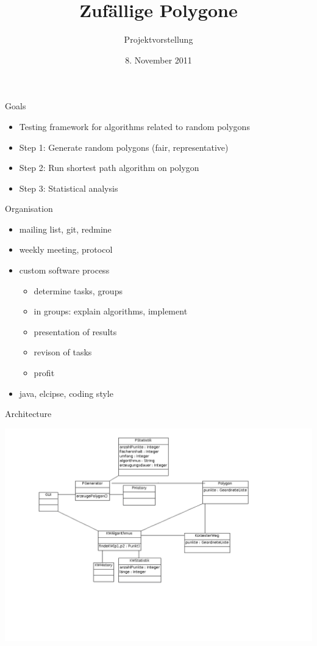 \documentclass[ucs,11pt]{beamer}
\title[Zufällige Polygone]{Zufällige Polygone}
\subtitle{Projektvorstellung}
\institute[FU Berlin]{Freie Universität Berlin}
\date[08.11.2011]{8. November 2011}
\begin{document}
\begin{frame}[plain]
	\titlepage
\end{frame}

\begin{frame}{Goals}
	\begin{itemize}
	\item Testing framework for algorithms related to random polygons
	\item Step 1: Generate random polygons (fair, representative)
	\item Step 2: Run shortest path algorithm on polygon
	\item Step 3: Statistical analysis
	\end{itemize}
\end{frame}

\begin{frame}{Organisation}
  \begin{itemize}
    \item mailing list, git, redmine
    \item weekly meeting, protocol
    \item custom software process
      \begin{itemize}
        \item determine tasks, groups
        \item in groups: explain algorithms, implement
        \item presentation of results
        \item revison of tasks
        \item profit
      \end{itemize}
    \item java, elcipse, coding style
  \end{itemize}
\end{frame}

\begin{frame}{Architecture}
  \begin{center}
	  \includegraphics[width=\textwidth]{ClassDiagram.png}
  \end{center}
\end{frame}
\end{document}
